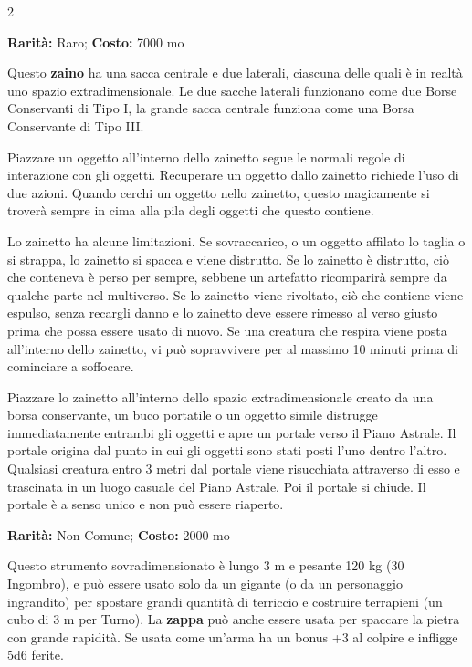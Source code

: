 \begin{multicols}{2}

\textbf{Rarità:} Raro; \textbf{Costo:} 7000 mo

Questo \textbf{zaino} ha una sacca centrale e due laterali, ciascuna delle quali è in realtà uno spazio extradimensionale.
Le due sacche laterali funzionano come due Borse Conservanti di Tipo I, la grande sacca centrale funziona come una Borsa Conservante di Tipo III.

Piazzare un oggetto all'interno dello zainetto segue le normali regole di interazione con gli oggetti. Recuperare un oggetto dallo zainetto richiede l'uso di due azioni. Quando cerchi un oggetto nello zainetto, questo magicamente si troverà sempre in cima alla pila degli oggetti che questo contiene.

Lo zainetto ha alcune limitazioni. Se sovraccarico, o un oggetto affilato lo taglia o si strappa, lo zainetto si spacca e viene distrutto. Se lo zainetto è distrutto, ciò che conteneva è perso per sempre, sebbene un artefatto ricomparirà sempre da qualche parte nel multiverso. Se lo zainetto viene rivoltato, ciò che contiene viene espulso, senza recargli danno e lo zainetto deve essere rimesso al verso giusto prima che possa essere usato di nuovo. Se una creatura che respira viene posta all'interno dello zainetto, vi può sopravvivere per al massimo 10 minuti prima di cominciare a soffocare.

Piazzare lo zainetto all'interno dello spazio extradimensionale creato da una borsa conservante, un buco portatile o un oggetto simile distrugge immediatamente entrambi gli oggetti e apre un portale verso il Piano Astrale. Il portale origina dal punto in cui gli oggetti sono stati posti l'uno dentro l'altro. Qualsiasi creatura entro 3 metri dal portale viene risucchiata attraverso di esso e trascinata in un luogo casuale del Piano Astrale. Poi il portale si chiude. Il portale è a senso unico e non può essere riaperto.


\textbf{Rarità:} Non Comune; \textbf{Costo:} 2000 mo

Questo strumento sovradimensionato è lungo 3 m e pesante 120 kg (30 Ingombro), e può essere usato solo da un gigante (o da un personaggio ingrandito) per spostare grandi quantità di terriccio e costruire terrapieni (un cubo di 3 m per Turno). La \textbf{zappa} può anche essere usata per spaccare la pietra con grande rapidità. Se usata come un'arma ha un bonus +3 al colpire e infligge 5d6 ferite.


\end{multicols}
